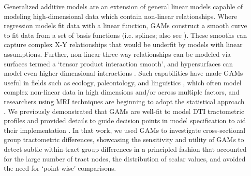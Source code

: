 \documentclass[]{imag-ms-template}
\begin{document}
Generalized additive models \parencite[GAMs;][]{wood2017GeneralizedAdditiveModels,pedersen2019HierarchicalGeneralizedAdditive,stasinopoulos2008GeneralizedAdditiveModels} are an extension of general linear models capable of modeling high-dimensional data which contain non-linear relationships. Where regression models fit data with a linear function, GAMs construct a smooth curve to fit data from a set of basis functions (i.e. splines; also see \textcite{verbyla1999AnalysisDesignedExperiments}). These smooths can capture complex X-Y relationships that would be underfit by models with linear assumptions. Further, non-linear three-way relationships can be modeled via surfaces termed a `tensor product interaction smooth', and hypersurfaces can model even higher dimensional interactions \parencite{baayen2020IntroductionGeneralizedAdditive}. Such capabilities have made GAMs useful in fields such as ecology, paleontology, and linguistics \parencite[e.g.][]{simpson2018ModellingPalaeoecologicalTime,pedersen2019HierarchicalGeneralizedAdditive,schmidt2011SpatiallyExplicitHeight,wieling2011QuantitativeSocialDialectology,simpson2018ModellingPalaeoecologicalTime,wieling2018AnalyzingDynamicPhonetic,murase2009ApplicationGeneralizedAdditive,vanrij2019AnalyzingTimeCourse}, which often model complex non-linear data in high dimensions and/or across multiple factors, and researchers using MRI techniques are beginning to adopt the statistical approach \parencite[e.g.][]{lee2025AtypicalMaturationFunctional,xu2025AgeBSASexspecific,wierenga2018UnravelingAgePuberty,mundo2022GeneralizedAdditiveModels,roy2025DevelopmentArcuateFasciculus,sorensen2021MetaanalysisGeneralizedAdditive,caffarra2024DevelopmentAlphaRhythm}. We previously demonstrated that GAMs are well-fit to model DTI tractometric profiles and provided details to guide decision points in model specification to aid their implementation \parencite{muncy2022GeneralAdditiveModels}. In that work, we used GAMs to investigate cross-sectional group tractometric differences, showcasing the sensitivity and utility of GAMs to detect subtle within-tract group differences in a principled fashion that accounted for the large number of tract nodes, the distribution of scalar values, and avoided the need for `point-wise' comparisons.
\end{document}
